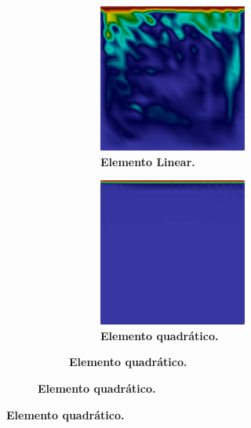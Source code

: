 \begin{figure}[h!]
    \centering
    \caption{Campos de velocidades no instante $t=100$.}
    \begin{subfigure}{\textwidth}\centering
        \begin{subfigure}{\textwidth}\centering
            \begin{subfigure}{.32\textwidth}
                \caption*{\textbf{Elemento Linear.}}
                \includegraphics[width=\linewidth]{Figuras/cavity-poor/None-Lin.png}
            \end{subfigure}
            \begin{subfigure}{.32\textwidth}
                \caption*{\textbf{Elemento quadrático.}}
                \includegraphics[width=\linewidth]{Figuras/cavity-poor/None-Qua.png}

\end{subfigure}
\end{subfigure}
\end{subfigure}
\end{figure}
